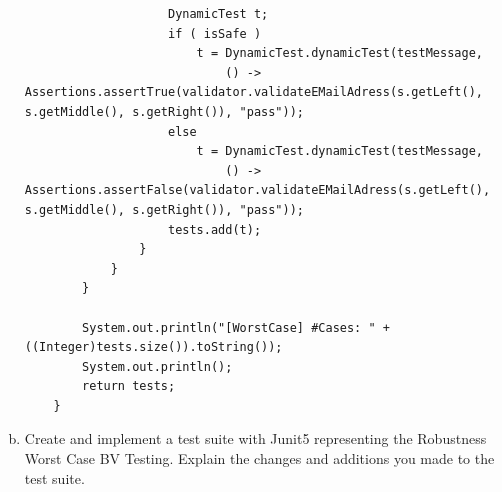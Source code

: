 \documentclass[a4paper,9pt,oneside]{scrreprt}
\begin{document}
\begin{enumerate}[a)]
\begin{lstlisting}
					DynamicTest t;
					if ( isSafe )
						t = DynamicTest.dynamicTest(testMessage,
							() -> Assertions.assertTrue(validator.validateEMailAdress(s.getLeft(), s.getMiddle(), s.getRight()), "pass"));
					else
						t = DynamicTest.dynamicTest(testMessage,
							() -> Assertions.assertFalse(validator.validateEMailAdress(s.getLeft(), s.getMiddle(), s.getRight()), "pass"));
					tests.add(t);
				}
			}
		}
		
		System.out.println("[WorstCase] #Cases: " + ((Integer)tests.size()).toString());
		System.out.println();
		return tests;
	}
\end{lstlisting}
		
		\clearpage
		
	
		
		\item Create and implement a test suite with Junit5 representing the Robustness Worst Case
		BV Testing. Explain the changes and additions you made to the test suite.
		
		\begin{paracol}{2}
			


\end{paracol}
\end{enumerate}
\end{document}
